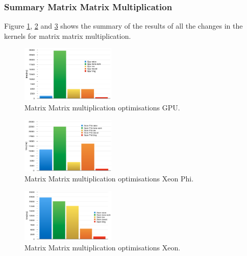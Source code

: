 \subsubsection{Summary Matrix Matrix Multiplication}

\par{Figure \ref{gpu}, \ref{phi} and \ref{xeon} shows the summary of the results of all the changes in the kernels for matrix
    matrix multiplication.}

\begin{figure}[!h]
    \centering
    \includegraphics[width=0.4\textwidth]{figures/gpu.png}
    \caption{Matrix Matrix multiplication optimisations GPU.}
    \label{gpu}
\end{figure}

\begin{figure}[!h]
    \centering
    \includegraphics[width=0.4\textwidth]{figures/phi.png}
    \caption{Matrix Matrix multiplication optimisations Xeon Phi.}
    \label{phi}
\end{figure}

\begin{figure}[!h]
    \centering
    \includegraphics[width=0.4\textwidth]{figures/xeon.png}
    \caption{Matrix Matrix multiplication optimisations Xeon.}
    \label{xeon}
\end{figure}

